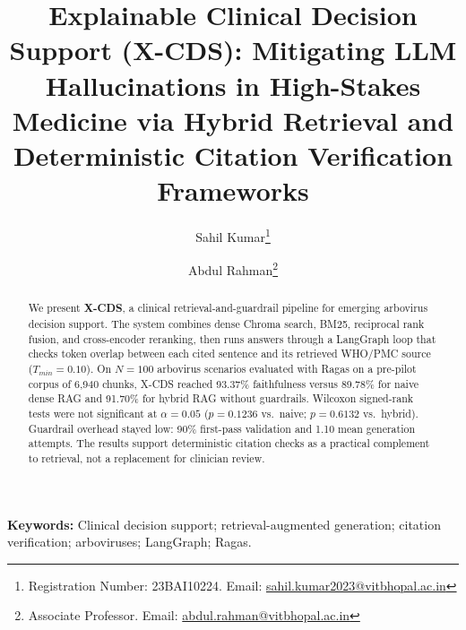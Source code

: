 \documentclass[11pt,a4paper]{article}
\title{Explainable Clinical Decision Support (X-CDS): Mitigating LLM Hallucinations in High-Stakes Medicine via Hybrid Retrieval and Deterministic Citation Verification Frameworks}
\author[1]{Sahil Kumar\thanks{Registration Number: 23BAI10224. Email: \href{mailto:sahil.kumar2023@vitbhopal.ac.in}{sahil.kumar2023@vitbhopal.ac.in}}}
\author[1]{Abdul Rahman\thanks{Associate Professor. Email: \href{mailto:abdul.rahman@vitbhopal.ac.in}{abdul.rahman@vitbhopal.ac.in}}}
\affil[1]{School of Computer Science and Engineering (SCSE), VIT Bhopal University, Bhopal, Madhya Pradesh, India}
\date{}
\begin{document}
\maketitle

\begin{abstract}
We present \textbf{X-CDS}, a clinical retrieval-and-guardrail pipeline for emerging arbovirus decision support. The system combines dense Chroma search, BM25, reciprocal rank fusion, and cross-encoder reranking, then runs answers through a LangGraph loop that checks token overlap between each cited sentence and its retrieved WHO/PMC source ($T_{min}=0.10$). On $N=100$ arbovirus scenarios evaluated with Ragas on a pre-pilot corpus of 6,940 chunks, X-CDS reached 93.37\% faithfulness versus 89.78\% for naive dense RAG and 91.70\% for hybrid RAG without guardrails. Wilcoxon signed-rank tests were not significant at $\alpha=0.05$ ($p=0.1236$ vs.\ naive; $p=0.6132$ vs.\ hybrid). Guardrail overhead stayed low: 90\% first-pass validation and 1.10 mean generation attempts. The results support deterministic citation checks as a practical complement to retrieval, not a replacement for clinician review.
\end{abstract}

\textbf{Keywords:} Clinical decision support; retrieval-augmented generation; citation verification; arboviruses; LangGraph; Ragas.

\newpage












\end{document}
